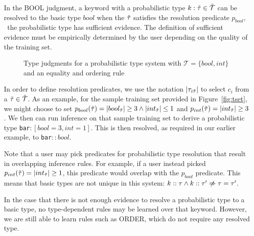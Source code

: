 In the {\scriptsize BOOL} judgment, a keyword with a probabilistic type $k : \tilde{\tau} \in \tilde{\mathcal{T}}$ can be resolved to the basic type $bool$ when the $\tilde{\tau}$ satisfies the resolution predicate $p_{bool}$, \ie\ the probabilistic type has sufficient evidence.
The definition of sufficient evidence must be empirically determined by the user depending on the quality of the training set.

{
\setlength{\abovecaptionskip}{-.05pt}
\setlength{\belowcaptionskip}{-15pt}
\begin{figure}
\caption{Type judgments for a probabilistic type system with $\mathcal{T} = \{bool,int\}$ and an equality and ordering rule}
\label{fig:ptypes}
\end{figure}
}

In order to define resolution predicates, we use the notation $|\tau_{i\tilde{\tau}}|$ to select $c_i$ from a $\tilde{\tau} \in \tilde{\mathcal{T}}$.
As an example, for the sample training set provided in Figure~\ref{fig:tset}, we might choose to set $p_{bool}(\tilde{\tau})= |bool_{\tilde{\tau}}| \geq 3 \land |int_{\tilde{\tau}}| \leq 1$ and $p_{int}(\tilde{\tau})= |int_{\tilde{\tau}}| \geq 3$.
We then can run inference on that sample training set to derive a probabilistic type \texttt{bar}$:[bool=3,int=1]$.
This is then resolved, as required in our earlier example, to \texttt{bar}$::bool$.
 
Note that a user may pick predicates for probabilistic type resolution that result in overlapping inference rules.
For example, if a user instead picked $p_{int}(\tilde{\tau})= |int_{\tilde{\tau}}| \geq 1$, this predicate would overlap with the $p_{bool}$ predicate.
This means that basic types are not unique in this system:  $k::\tau \land k::\tau' \centernot\implies \tau = \tau'$.

In the case that there is not enough evidence to resolve a probabilistic type to a basic type, no type-dependent rules may be learned over that keyword.
However, we are still able to learn rules such as {\scriptsize ORDER}, which do not require any resolved type. 



